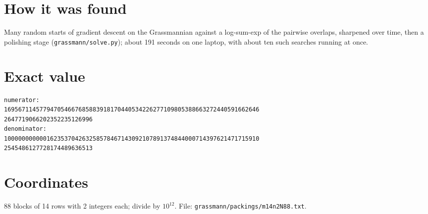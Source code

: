 \documentclass[11pt,a4paper]{article}
\begin{document}
\section{How it was found}
Many random starts of gradient descent on the Grassmannian against a log-sum-exp of the pairwise overlaps, sharpened over time, then a polishing stage (\texttt{grassmann/solve.py}); about 191 seconds on one laptop, with about ten such searches running at once.


\appendix
\section{Exact value}
{\small
\begin{verbatim}
numerator:
169567114577947054667685883918170440534226277109805388663272440591662646
2647719066202352235126996
denominator:
100000000000162353704263258578467143092107891374844000714397621471715910
2545486127728174489636513
\end{verbatim}}

\section{Coordinates}
88 blocks of 14 rows with 2 integers each; divide by $10^{12}$. File: \texttt{grassmann/packings/m14n2N88.txt}.
{\tiny
\begin{multicols}{4}
\end{multicols}}
\end{document}
